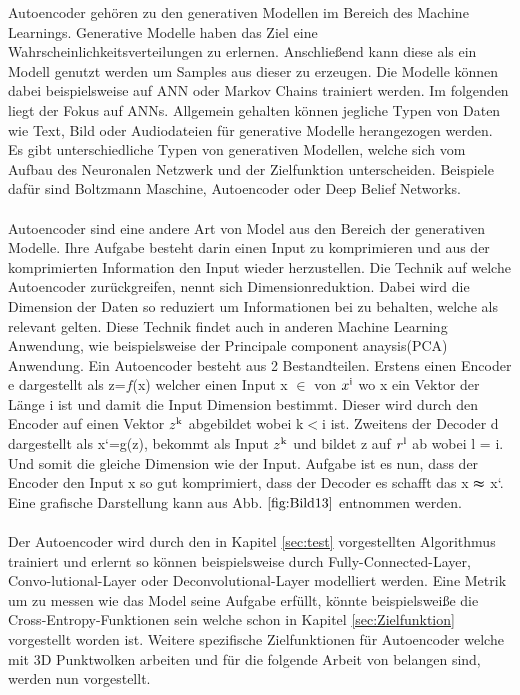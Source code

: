 \documentclass{llncs}
\begin{document}
Autoencoder gehören zu den generativen Modellen im Bereich des Machine Learnings. Generative Modelle haben das Ziel eine Wahrscheinlichkeitsverteilungen zu erlernen. Anschließend kann diese als ein Modell genutzt werden um Samples aus dieser zu erzeugen. Die Modelle können dabei beispielsweise auf ANN oder Markov Chains trainiert werden\cite{Grundlagen}. Im folgenden liegt der Fokus auf ANNs. Allgemein gehalten können jegliche Typen von Daten wie Text, Bild oder Audiodateien für generative Modelle herangezogen werden. Es gibt unterschiedliche Typen von generativen Modellen, welche sich vom Aufbau des Neuronalen Netzwerk und der Zielfunktion unterscheiden. Beispiele dafür sind Boltzmann Maschine, Autoencoder oder Deep Belief Networks\cite{Grundlagen}. 
\\\\
Autoencoder sind eine andere Art von Model aus den Bereich der generativen Modelle. Ihre Aufgabe besteht darin einen Input zu komprimieren und aus der komprimierten Information den Input wieder herzustellen. Die Technik auf welche Autoencoder zurückgreifen, nennt sich Dimensionreduktion. Dabei wird die Dimension der Daten so reduziert um Informationen bei zu behalten, welche als relevant gelten. Diese Technik findet auch in anderen Machine Learning Anwendung, wie beispielsweise der Principale component anaysis(PCA) Anwendung\cite{dimreduction}.  Ein Autoencoder besteht aus 2 Bestandteilen. Erstens einen Encoder e dargestellt als z=$f$(x) welcher einen Input x $\in$ von $x\textsuperscript{i}$ wo x ein Vektor der Länge i ist und damit die Input Dimension bestimmt. Dieser wird durch den Encoder auf einen Vektor $z\textsuperscript{k}$ abgebildet wobei k$<$i ist. Zweitens der Decoder d dargestellt als x`=g(z), bekommt als Input $z\textsuperscript{k}$ und bildet z auf $r\textsuperscript{l}$ ab wobei l = i. Und somit die gleiche Dimension wie der Input. Aufgabe ist es nun, dass der Encoder den Input x so gut komprimiert, dass der Decoder es schafft das x $\thickapprox$ x`. Eine grafische Darstellung kann aus Abb. $\ref{fig:Bild13}$ entnommen werden\cite{Grundlagen}. 
\\\\
Der Autoencoder wird durch den in Kapitel \ref{sec:test} vorgestellten Algorithmus trainiert und erlernt so können beispielsweise durch Fully-Connected-Layer,  Convo-lutional-Layer oder Deconvolutional-Layer modelliert werden. Eine Metrik um zu messen wie das Model seine Aufgabe erfüllt, könnte beispielsweiße die Cross-Entropy-Funktionen sein welche schon in Kapitel \ref{sec:Zielfunktion} vorgestellt worden ist. Weitere spezifische Zielfunktionen für Autoencoder welche mit 3D Punktwolken arbeiten und für die folgende Arbeit von belangen sind, werden nun vorgestellt.
\end{document}
